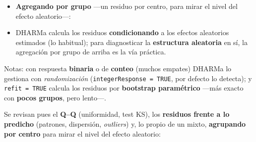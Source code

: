 \documentclass[
  letterpaper,
  DIV=11,
  numbers=noendperiod]{scrartcl}
\newenvironment{Shaded}{\begin{snugshade}}{\end{snugshade}}
\newcommand{\AttributeTok}[1]{\textcolor[rgb]{0.40,0.45,0.13}{#1}}
\newcommand{\CommentTok}[1]{\textcolor[rgb]{0.37,0.37,0.37}{#1}}
\newcommand{\FunctionTok}[1]{\textcolor[rgb]{0.28,0.35,0.67}{#1}}
\newcommand{\NormalTok}[1]{\textcolor[rgb]{0.00,0.23,0.31}{#1}}
\newcommand{\OtherTok}[1]{\textcolor[rgb]{0.00,0.23,0.31}{#1}}
\newcommand{\SpecialCharTok}[1]{\textcolor[rgb]{0.37,0.37,0.37}{#1}}
\providecommand{\tightlist}{%
  \setlength{\itemsep}{0pt}\setlength{\parskip}{0pt}}\usepackage{longtable,booktabs,array}
\begin{document}
\begin{tcolorbox}
\begin{Shaded}
\end{Shaded}

\begin{itemize}
\tightlist
\item
  \textbf{Agregando por grupo} ---un residuo por centro, para mirar el
  nivel del efecto aleatorio---:
\end{itemize}

\begin{Shaded}
\end{Shaded}

\begin{itemize}
\tightlist
\item
  DHARMa calcula los residuos \textbf{condicionando} a los efectos
  aleatorios estimados (lo habitual); para diagnosticar la
  \textbf{estructura aleatoria} en sí, la agregación por grupo de arriba
  es la vía práctica.
\end{itemize}

Notas: con respuesta \textbf{binaria} o de \textbf{conteo} (muchos
empates) DHARMa lo gestiona con \emph{randomización}
(\texttt{integerResponse\ =\ TRUE}, por defecto lo detecta); y
\texttt{refit\ =\ TRUE} calcula los residuos por \textbf{bootstrap
paramétrico} ---más exacto con \textbf{pocos grupos}, pero lento---.

\end{tcolorbox}

Se revisan pues el \textbf{Q--Q} (uniformidad, test KS), los
\textbf{residuos frente a lo predicho} (patrones, dispersión,
\emph{outliers}) y, lo propio de un mixto, \textbf{agrupando por centro}
para mirar el nivel del efecto aleatorio:
\end{document}
